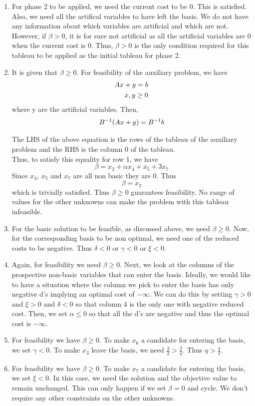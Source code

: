 \begin{enumerate}
    \item For phase 2 to be applied, we need the current cost to be 0. This is satisfied. Also, we need all the artifical variables to have left the basis. We do not have any information about which variables are artificial and which are not. However, if $\beta > 0$, it is for sure not artificial as all the artificial variables are 0 when the current cost is 0. Thus, $\beta > 0$ is the only condition required for this tableau to be applied as the initial tableau for phase 2.
    \item It is given that $\beta \ge 0$. 
    For feasibility of the auxiliary problem, we have 
    \begin{align}
        Ax + y = b \notag\\
        x,y \ge 0 \notag
    \end{align}
    where y are the artificial variables. Then,
    \begin{align}
        B^{-1}(Ax + y) = B^{-1}b \notag\\
    \end{align}

    The LHS of the above equation is the rows of the tableau of the auxiliary problem and the RHS is the column 0 of the tableau. \\
    Thus, to satisfy this equality for row 1, we have
    \[
        \beta = x_2 + \alpha x_4 + x_5 + 3x_7 
    \]
    Since $x_4$, $x_5$ and $x_7$ are all non basic they are 0. Thus
    \[
        \beta = x_2
    \]
    which is trivially satisfied.
    Thus $\beta \ge 0$ guarantees feasibility. No range of values for the other unknowns can make the problem with this tableau infeasible.

    \item For the basic solution to be feasible, as discussed above, we need $\beta \ge 0$. Now, for the corresponding basis to be non optimal, we need one of the reduced costs to be negative. Thus $\delta < 0$ or $\gamma < 0$ or $\xi < 0$.
    \item Again, for feasibility we need $\beta \ge 0$. Next, we look at the columns of the prospective non-basic variables that can enter the basis. Ideally, we would like to have a situation where the column we pick to enter the basis has only negative d's implying an optimal cost of $-\infty$. We can do this by setting $\gamma > 0$ and $\xi > 0$ and $\delta < 0$ so that column 4 is the only one with negative reduced cost. Then, we set $\alpha \le 0$ so that all the d's are negative and thus the optimal cost is $-\infty$.
    \item For feasibility we have $\beta \ge 0$. To make $x_6$ a candidate for entering the basis, we set $\gamma < 0$. To make $x_3$ leave the basis, we need $\frac{3}{2} > \frac{2}{\eta}$. Thus $\eta > \frac{4}{3}$.
    \item For feasibility we have $\beta \ge 0$. To make $x_7$ a candidate for entering the basis, we set $\xi < 0$. In this case, we need the solution and the objective value to remain unchanged. This can only happen if we set $\beta = 0$ and cycle. We don't require any other constraints on the other unknowns. 
\end{enumerate}